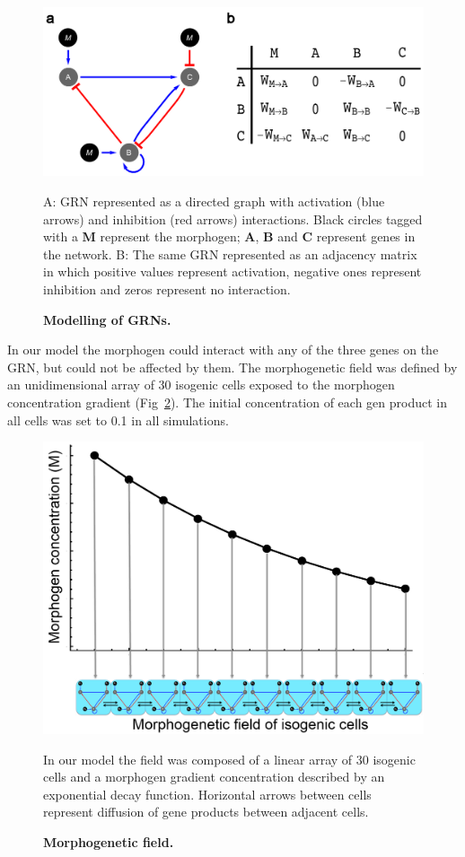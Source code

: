 \documentclass[10pt,letterpaper]{article}
\begin{document}
\begin{figure}[!h]
 \includegraphics[width=\textwidth]{figures/metodos/matriz-de-adyacencia}
    \caption{\bf Modelling of GRNs.}
    A: GRN represented as a directed graph with activation (blue arrows) and 
    inhibition (red arrows) interactions. Black circles
    tagged with a \textbf{M} represent the morphogen; \textbf{A}, \textbf{B} and
    \textbf{C} represent genes in the network.
    B: The same GRN represented as an adjacency matrix in which positive values 
    represent activation, negative ones represent inhibition and
    zeros represent no interaction.
 \label{fig:adjmat}
\end{figure}

In our model the morphogen could interact with any of the three genes on the 
GRN, but could not be affected by them. The morphogenetic field was defined by 
an unidimensional array of 30 isogenic cells exposed to the morphogen 
concentration gradient (Fig~\ref{fig:morfgrad}). The initial concentration of 
each gen product in all cells was set to 0.1 in all simulations.\\

\begin{figure}[!h]
 \includegraphics[width=\textwidth]{figures/metodos/morphogen-gradient}
 \caption{\bf Morphogenetic field.}
 In our model the field was composed of a linear array of 30 isogenic cells and 
 a morphogen gradient concentration described by an exponential decay function. 
 Horizontal arrows between cells represent diffusion of gene products between 
 adjacent cells.
 \label{fig:morfgrad}
\end{figure}
\end{document}
